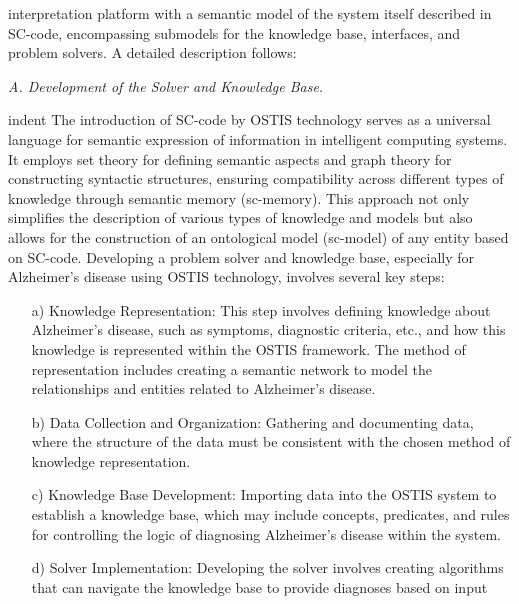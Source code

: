 \documentclass[10pt, a4paper]{article}
\begin{document}
\begin{SCn}
\begin{small}
\begin{multicols}{2}
\fontsize {10}{14}\selectfont 
\noindent
interpretation platform with a semantic model of the
system itself described in SC-code, encompassing submodels for the knowledge base, interfaces, and problem
solvers. A detailed description follows:\par
\vspace {0.5cm}
\noindent
\textit{A. Development of the Solver and Knowledge Base.}
\par
indent  The introduction of SC-code by OSTIS technology serves as a universal language for semantic expression of information in intelligent computing systems. It employs set theory for defining semantic aspects and graph theory for constructing syntactic structures, ensuring compatibility across different types of knowledge through semantic
memory (sc-memory). This approach not only simplifies
the description of various types of knowledge and models
but also allows for the construction of an ontological
model (sc-model) of any entity based on SC-code.
Developing a problem solver and knowledge base, especially for Alzheimer’s disease using OSTIS technology,
involves several key steps:
\begin{flushright}
\begin{enumerate}
\item [a)] Knowledge Representation: This step involves defining knowledge about Alzheimer’s disease, such as symptoms, diagnostic criteria, etc., and how this knowledge is represented within the OSTIS framework. The method of representation includes creating a semantic network to model the relationships
and entities related to Alzheimer’s disease.
 \vspace{-0.2cm}
\item [b)] Data Collection and Organization: Gathering and
documenting data, where the structure of the data
must be consistent with the chosen method of knowledge representation.
\vspace{-0.2cm}
\item [c)] Knowledge Base Development: Importing data into
the OSTIS system to establish a knowledge base,
which may include concepts, predicates, and rules
for controlling the logic of diagnosing Alzheimer’s
disease within the system.
\vspace{-0.2cm}
\item [d)] Solver Implementation: Developing the solver involves creating algorithms that can navigate the
knowledge base to provide diagnoses based on input

\end{enumerate}
\end{flushright}
\end{multicols}
\end{small}
\end{SCn}
\end{document}
